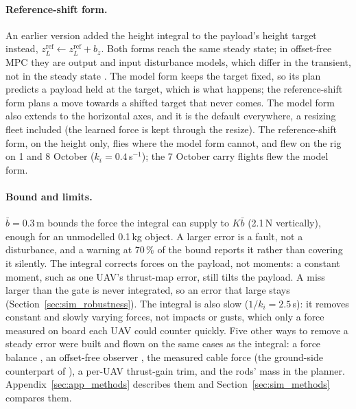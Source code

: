 \paragraph{Reference-shift form.} An earlier version added the height integral to the payload's height
target instead, $z_L^{\mathrm{ref}} \leftarrow z_L^{\mathrm{ref}} + b_z$. Both forms reach the same steady
state; in offset-free MPC they are output and input disturbance models, which differ in the transient, not
in the steady state \cite{pannocchia2007combined}. The model form keeps the target fixed, so its plan
predicts a payload held at the target, which is what happens; the reference-shift form plans a move towards
a shifted target that never comes. The model form also extends to the horizontal axes, and it is the
default everywhere, a resizing fleet included (the learned force is kept through the resize). The
reference-shift form, on the height only, flies where the model form cannot, and flew on the rig on 1 and
8 October ($k_i = 0.4$\,s$^{-1}$); the 7 October carry flights flew the model form.

\paragraph{Bound and limits.} $\bar{b} = 0.3$\,m bounds the force the integral can supply to $K\bar{b}$
(2.1\,N vertically), enough for an unmodelled 0.1\,kg object. A larger error is a fault, not a disturbance,
and a warning at 70\,\% of the bound reports it rather than covering it silently. The integral corrects
forces on the payload, not moments: a constant moment, such as one UAV's thrust-map error, still tilts the
payload. A miss larger than the gate is never integrated, so an error that large stays
(Section~\ref{sec:sim_robustness}). The integral is also slow ($1/k_i = 2.5$\,s): it removes constant and
slowly varying forces, not impacts or gusts, which only a force measured on board each UAV could counter
quickly. Five other ways to remove a steady error were built and flown on the same cases as the integral:
a force balance \cite{muske2002disturbance}, an offset-free observer \cite{pannocchia2003disturbance}, the
measured cable force (the ground-side counterpart of \cite{tudelft}), a per-UAV thrust-gain trim, and the
rods' mass in the planner. Appendix~\ref{sec:app_methods} describes them and Section~\ref{sec:sim_methods}
compares them.


